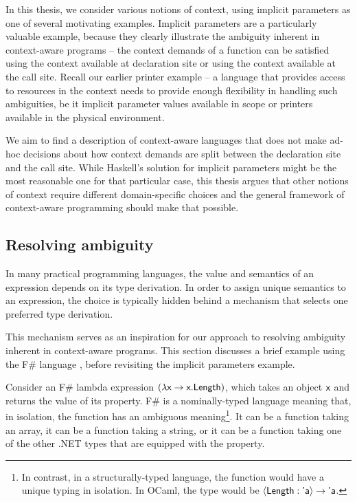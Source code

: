 In this thesis, we consider various notions of context, using implicit parameters as one
of several motivating examples. Implicit parameters are a particularly valuable example, because they
clearly illustrate the ambiguity inherent in context-aware programs -- the context demands of
a function can be satisfied using the context available at declaration site or using the context
available at the call site. Recall our earlier printer example -- a language that
provides access to resources in the context needs to provide enough flexibility in handling such
ambiguities, be it implicit parameter values available in scope or printers available in the
physical environment.

We aim to find a description of context-aware languages that does not make ad-hoc decisions
about how context demands are split between the declaration site and the call site. While
Haskell's solution for implicit parameters might be the most reasonable one for that particular
case, this thesis argues that other notions of context require different domain-specific choices
and the general framework of context-aware programming should make that possible.


\subsection{Resolving ambiguity}
\label{sec:path-binding-amb}

In many practical programming languages, the value and semantics of an expression depends on its
type derivation. In order to assign unique semantics to an expression, the choice is typically
hidden behind a mechanism that selects one preferred type derivation.

This mechanism serves as an inspiration for our approach to resolving ambiguity inherent in
context-aware programs. This section discusses a brief example using the F\# language \cite{app-fsharp},
before revisiting the implicit parameters example.

Consider an F\# lambda expression $(\lambda\textnormal{\sffamily x}\rightarrow\textnormal{\sffamily x.Length})$, which takes
an object $\textnormal{\sffamily x}$ and returns the value of its  property. F\# is a nominally-typed
language meaning that, in isolation, the function has an ambiguous meaning\footnote{In contrast,
in a structurally-typed language, the function would have a unique typing in isolation. In OCaml,
the type would be $\langle \textnormal{\sffamily Length}:\textnormal{\sffamily 'a}\rangle \rightarrow \textnormal{\sffamily 'a}$.}. It can be
a function taking an array, it can be a function taking a string, or it can be a function taking
one of the other .NET types that are equipped with the  property.

